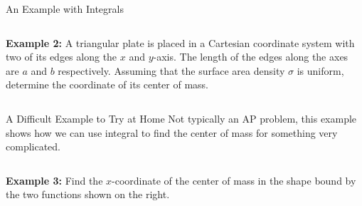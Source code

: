 \documentclass[12pt,compress,aspectratio=169]{beamer}
\begin{document}
\begin{frame}{An Example with Integrals}
  \begin{columns}
    \textbf{Example 2:} A triangular plate is placed in a Cartesian coordinate
    system with two of its edges along the $x$ and $y$-axis. The length of the
    edges along the axes are $a$ and $b$ respectively. Assuming that the
    surface area density $\sigma$ is uniform, determine the coordinate of its
    center of mass.

  \end{columns}
\end{frame}



\begin{frame}{A Difficult Example to Try at Home}
  Not typically an AP problem, this example shows how we can use integral to
  find the center of mass for something very complicated.
  \begin{columns}
    \textbf{Example 3:} Find the $x$-coordinate of the center of mass in the
    shape bound by the two functions shown on the right.

  \end{columns}
\end{frame}
\end{document}
